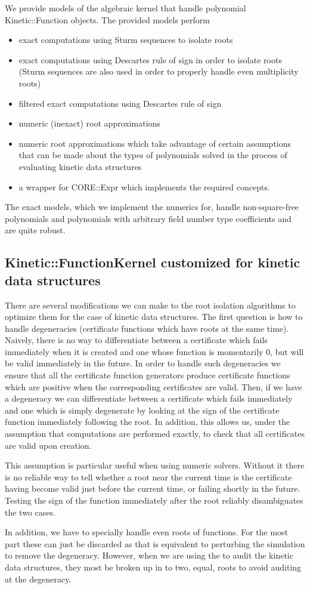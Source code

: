 We provide models of the algebraic kernel that handle polynomial
Kinetic::Function objects. The provided models perform
\begin{itemize}
\item exact computations using Sturm sequences to isolate roots
\item exact computations using Descartes rule of sign in order to
  isolate roots (Sturm sequences are also used in order to properly
  handle even multiplicity roots)
\item filtered exact computations using Descartes rule of sign
\item numeric (inexact) root approximations
\item numeric root approximations which take advantage of certain
  assumptions that can be made about the types of polynomials solved
  in the process of evaluating kinetic data structures
\item a wrapper for CORE::Expr which implements the required
  concepts.
\end{itemize}
The exact models, which we implement the numerics for, handle
non-square-free polynomials and polynomials with arbitrary field
number type coefficients and are quite robust.


\subsection{Kinetic::FunctionKernel customized for kinetic data structures}

There are several modifications we can make to the root isolation
algorithms to optimize them for the case of kinetic data structures.
The first question is how to handle degeneracies (certificate
functions which have roots at the same time).  Naively, there is no
way to differentiate between a certificate which fails immediately
when it is created and one whose function is momentarily 0, but will
be valid immediately in the future. In order to handle such
degeneracies we ensure that all the certificate function generators
produce certificate functions which are positive when the
corresponding certificates are valid.  Then, if we have a degeneracy
we can differentiate between a certificate which fails immediately and
one which is simply degenerate by looking at the sign of the
certificate function immediately following the root. In addition, this
allows us, under the assumption that computations are performed
exactly, to check that all certificates are valid upon creation.

This assumption is particular useful when using numeric solvers.
Without it there is no reliable way to tell whether a root near the
current time is the certificate having become valid just before the
current time, or failing shortly in the future. Testing the sign of
the function immediately after the root reliably disambiguates the two
cases.

In addition, we have to specially handle even roots of functions. For
the most part these can just be discarded as that is equivalent to
perturbing the simulation to remove the degeneracy. However, when we
are using the  to audit the kinetic data structures,
they most be broken up in to two, equal, roots to avoid auditing at
the degeneracy.
